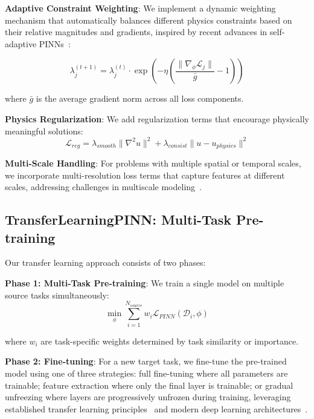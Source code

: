\documentclass[review]{elsarticle}
\begin{document}
\textbf{Adaptive Constraint Weighting}: We implement a dynamic weighting mechanism that automatically balances different physics constraints based on their relative magnitudes and gradients, inspired by recent advances in self-adaptive PINNs~\cite{mcclenny2023self}:

\begin{equation}
\lambda_j^{(t+1)} = \lambda_j^{(t)} \cdot \exp\left(-\eta \left(\frac{\|\nabla_\phi \mathcal{L}_j\|}{\bar{g}} - 1\right)\right)
\end{equation}

where $\bar{g}$ is the average gradient norm across all loss components.

\textbf{Physics Regularization}: We add regularization terms that encourage physically meaningful solutions:
\begin{equation}
\mathcal{L}_{reg} = \lambda_{smooth} \|\nabla^2 u\|^2 + \lambda_{consist} \|u - u_{physics}\|^2
\end{equation}

\textbf{Multi-Scale Handling}: For problems with multiple spatial or temporal scales, we incorporate multi-resolution loss terms that capture features at different scales, addressing challenges in multiscale modeling~\cite{weinan2011principles,kevrekidis2003equation}.

\subsection{TransferLearningPINN: Multi-Task Pre-training}

Our transfer learning approach consists of two phases:

\textbf{Phase 1: Multi-Task Pre-training}: We train a single model on multiple source tasks simultaneously:
\begin{equation}
\min_\phi \sum_{i=1}^{N_{source}} w_i \mathcal{L}_{PINN}(\mathcal{D}_i, \phi)
\end{equation}

where $w_i$ are task-specific weights determined by task similarity or importance.

\textbf{Phase 2: Fine-tuning}: For a new target task, we fine-tune the pre-trained model using one of three strategies: full fine-tuning where all parameters are trainable; feature extraction where only the final layer is trainable; or gradual unfreezing where layers are progressively unfrozen during training, leveraging established transfer learning principles~\cite{pan2009survey} and modern deep learning architectures~\cite{he2016deep,lecun2015deep}.
\end{document}
